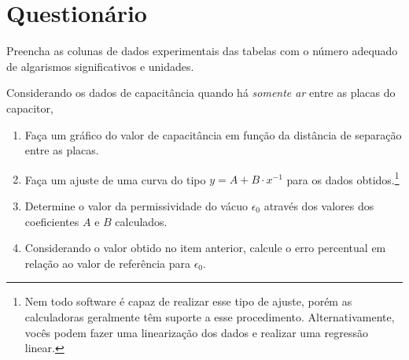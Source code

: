 
\vspace{15mm}

\begin{fullwidth}
\noindent{}
\vspace{5mm}

\noindent{}

\noindent{}

\noindent{}

\noindent{}

\noindent{}
\end{fullwidth}

\vspace{5mm}

\section{Questionário}

\begin{question}[type={exam}]{2}
Preencha as colunas de dados experimentais das tabelas com o número adequado de algarismos significativos e unidades.
\end{question}

\begin{question}[type={exam}]{3} Considerando os dados de capacitância quando há \emph{somente ar} entre as placas do capacitor,
\begin{enumerate}[label=\roman*.]
    \item Faça um gráfico do valor de capacitância em função da distância de separação entre as placas.
    \item Faça um ajuste de uma curva do tipo $y = A + B \cdot x^{-1}$ para os dados obtidos.\footnote{Nem todo software é capaz de realizar esse tipo de ajuste, porém as calculadoras geralmente têm suporte a esse procedimento. Alternativamente, vocês podem fazer uma linearização dos dados e realizar uma regressão linear.} 
    \item Determine o valor da permissividade do vácuo $\epsilon_0$ através dos valores dos  coeficientes $A$ e $B$ calculados.
    \item Considerando o valor obtido no item anterior, calcule o erro percentual em relação ao valor de referência para $\epsilon_0$.
\end{enumerate}
\end{question}

